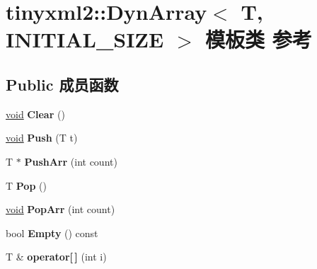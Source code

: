 \hypertarget{classtinyxml2_1_1_dyn_array}{}\section{tinyxml2\+:\+:Dyn\+Array$<$ T, I\+N\+I\+T\+I\+A\+L\+\_\+\+S\+I\+ZE $>$ 模板类 参考}
\label{classtinyxml2_1_1_dyn_array}
\subsection*{Public 成员函数}
\begin{DoxyCompactItemize}
\item 
\mbox{\label{classtinyxml2_1_1_dyn_array_af87a804cd831226d069274b44b74b8bc}} 
\hyperlink{interfacevoid}{void} {\bfseries Clear} ()
\item 
\mbox{\label{classtinyxml2_1_1_dyn_array_aea7ffe983b5d3284bd43171afd7c99d0}} 
\hyperlink{interfacevoid}{void} {\bfseries Push} (T t)
\item 
\mbox{\label{classtinyxml2_1_1_dyn_array_ad289abee8cd02b26e215f1b63d2043f1}} 
T $\ast$ {\bfseries Push\+Arr} (int count)
\item 
\mbox{\label{classtinyxml2_1_1_dyn_array_a27a3f2f6f869815b6eabb3ea40cf0712}} 
T {\bfseries Pop} ()
\item 
\mbox{\label{classtinyxml2_1_1_dyn_array_ab8b8c94a2312ab27e2846f0d61ef677a}} 
\hyperlink{interfacevoid}{void} {\bfseries Pop\+Arr} (int count)
\item 
\mbox{\label{classtinyxml2_1_1_dyn_array_a044fc26f44ed3e96ffaeac542188149e}} 
bool {\bfseries Empty} () const
\item 
\mbox{\label{classtinyxml2_1_1_dyn_array_a756cf4e7464c711aa720e2b17a251daa}} 
T \& {\bfseries operator\mbox{[}$\,$\mbox{]}} (int i)
\item 
\mbox{\label{classtinyxml2_1_1_dyn_array_a474a5cd9bc97ea32b3dcef4c773125e1}} 

\end{DoxyCompactItemize}
